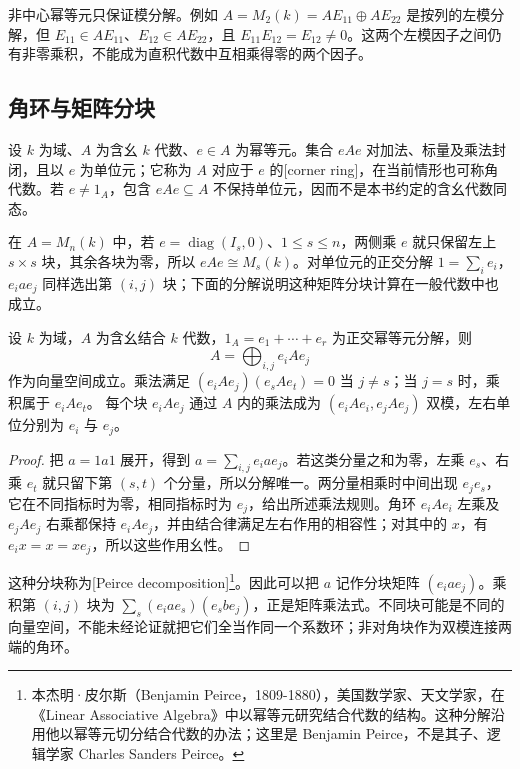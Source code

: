 非中心幂等元只保证模分解。例如 \(A=M_2(k)=AE_{11}\oplus AE_{22}\) 是按列的左模分解，但 \(E_{11}\in AE_{11}\)、\(E_{12}\in AE_{22}\)，且 \(E_{11}E_{12}=E_{12}\ne0\)。这两个左模因子之间仍有非零乘积，不能成为直积代数中互相乘得零的两个因子。

\subsection{角环与矩阵分块}
\label{b2:subsec:1103:02}

设 \(k\) 为域、\(A\) 为含幺 \(k\) 代数、\(e\in A\) 为幂等元。集合 \(eAe\) 对加法、标量及乘法封闭，且以 \(e\) 为单位元；它称为 \(A\) 对应于 \(e\) 的[corner ring]，在当前情形也可称角代数。若 \(e\ne1_A\)，包含 \(eAe\subseteq A\) 不保持单位元，因而不是本书约定的含幺代数同态。

\ProseParagraphBreak
在 \(A=M_n(k)\) 中，若 \(e=\operatorname{diag}(I_s,0)\)、\(1\le s\le n\)，两侧乘 \(e\) 就只保留左上 \(s\times s\) 块，其余各块为零，所以 \(eAe\cong M_s(k)\)。对单位元的正交分解 \(1=\sum_i e_i\)，\(e_i a e_j\) 同样选出第 \((i,j)\) 块；下面的分解说明这种矩阵分块计算在一般代数中也成立。

\begin{proposition}[幂等元分块]\label{b2:prop:peirce-decomposition}
	设 \(k\) 为域，\(A\) 为含幺结合 \(k\) 代数，\(1_A=e_1+\cdots+e_r\) 为正交幂等元分解，则
	\begin{equation}\label{b2:eq:peirce-decomposition}
		A=\bigoplus_{i,j}e_iAe_j
	\end{equation}
	作为向量空间成立。乘法满足 \((e_iAe_j)(e_sAe_t)=0\) 当 \(j\ne s\)；当 \(j=s\) 时，乘积属于 \(e_iAe_t\)。 每个块 \(e_iAe_j\) 通过 \(A\) 内的乘法成为 \((e_iAe_i,e_jAe_j)\) 双模，左右单位分别为 \(e_i\) 与 \(e_j\)。
\end{proposition}
\begin{proof}
	把 \(a=1a1\) 展开，得到 \(a=\sum_{i,j}e_i a e_j\)。若这类分量之和为零，左乘 \(e_s\)、右乘 \(e_t\) 就只留下第 \((s,t)\) 个分量，所以分解唯一。两分量相乘时中间出现 \(e_je_s\)，它在不同指标时为零，相同指标时为 \(e_j\)，给出所述乘法规则。角环 \(e_iAe_i\) 左乘及 \(e_jAe_j\) 右乘都保持 \(e_iAe_j\)，并由结合律满足左右作用的相容性；对其中的 \(x\)，有 \(e_ix=x=xe_j\)，所以这些作用幺性。
\end{proof}

这种分块称为[Peirce decomposition]\footnote{本杰明·皮尔斯（Benjamin Peirce，1809-1880），美国数学家、天文学家，在《Linear Associative Algebra》中以幂等元研究结合代数的结构。这种分解沿用他以幂等元切分结合代数的办法；这里是 Benjamin Peirce，不是其子、逻辑学家 Charles Sanders Peirce。}。因此可以把 \(a\) 记作分块矩阵 \((e_i a e_j)\)。乘积第 \((i,j)\) 块为 \(\sum_s(e_i a e_s)(e_s b e_j)\)，正是矩阵乘法式。不同块可能是不同的向量空间，不能未经论证就把它们全当作同一个系数环；非对角块作为双模连接两端的角环。

